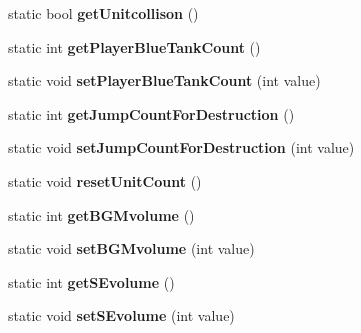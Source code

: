 \begin{DoxyCompactItemize}
\item 
static bool {\bfseries get\+Unitcollison} ()\hypertarget{class_game_settings_aeac78896ad8aac55d54e36452ed226c8}{}\label{class_game_settings_aeac78896ad8aac55d54e36452ed226c8}

\item 
static int {\bfseries get\+Player\+Blue\+Tank\+Count} ()\hypertarget{class_game_settings_a9934653147ad149f51cf0e3489be961a}{}\label{class_game_settings_a9934653147ad149f51cf0e3489be961a}

\item 
static void {\bfseries set\+Player\+Blue\+Tank\+Count} (int value)\hypertarget{class_game_settings_a3e0545d4fafb4af1a3bad7a5a2a474c9}{}\label{class_game_settings_a3e0545d4fafb4af1a3bad7a5a2a474c9}

\item 
static int {\bfseries get\+Jump\+Count\+For\+Destruction} ()\hypertarget{class_game_settings_a8f51a84a9cf7a93e00d07643974f55fb}{}\label{class_game_settings_a8f51a84a9cf7a93e00d07643974f55fb}

\item 
static void {\bfseries set\+Jump\+Count\+For\+Destruction} (int value)\hypertarget{class_game_settings_a884cbe017c236889d509e36d2f6a4f8b}{}\label{class_game_settings_a884cbe017c236889d509e36d2f6a4f8b}

\item 
static void {\bfseries reset\+Unit\+Count} ()\hypertarget{class_game_settings_a9ad65a0b954336d45ffb816af6cb9884}{}\label{class_game_settings_a9ad65a0b954336d45ffb816af6cb9884}

\item 
static int {\bfseries get\+B\+G\+Mvolume} ()\hypertarget{class_game_settings_a40fc00cb65266e231bd8fa17b42ef856}{}\label{class_game_settings_a40fc00cb65266e231bd8fa17b42ef856}

\item 
static void {\bfseries set\+B\+G\+Mvolume} (int value)\hypertarget{class_game_settings_a3eec97d0e385076fe812db30c966a7bf}{}\label{class_game_settings_a3eec97d0e385076fe812db30c966a7bf}

\item 
static int {\bfseries get\+S\+Evolume} ()\hypertarget{class_game_settings_ad762c594c185042c4b31a21691cc757e}{}\label{class_game_settings_ad762c594c185042c4b31a21691cc757e}

\item 
static void {\bfseries set\+S\+Evolume} (int value)\hypertarget{class_game_settings_a44db62397d2b3439492c0aea84a16c32}{}\label{class_game_settings_a44db62397d2b3439492c0aea84a16c32}

\end{DoxyCompactItemize}
